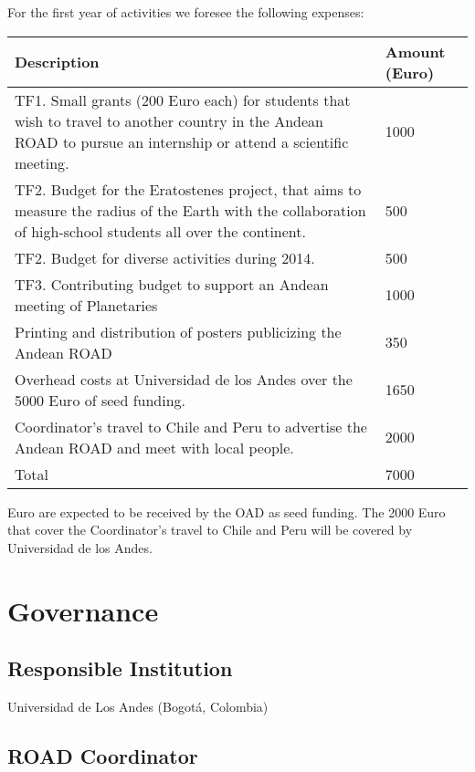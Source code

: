 \documentclass[12pt]{article}
\begin{document}
For the first year of activities we foresee the following expenses:

\begin{center}
\begin{tabular}{|p{11cm} |p{1.5cm}|}\hline\hline
Description &Amount (Euro) \\\hline
TF1. Small grants (200 Euro each) for students that wish to travel to
another country in the Andean ROAD to pursue an internship or attend a
scientific meeting. & 1000\\\hline
TF2. Budget for the Eratostenes project, that aims to measure the
radius of the Earth with the collaboration of high-school students all
over the continent. &500\\\hline
TF2. Budget for diverse activities during 2014.&500\\\hline
TF3. Contributing budget to support an Andean meeting of
Planetaries&1000\\\hline 
Printing and distribution of posters publicizing the Andean ROAD
&350\\\hline 
Overhead costs at Universidad de los Andes over the 5000 Euro of seed
funding. & 1650\\\hline 
Coordinator’s travel to Chile and Peru to advertise the Andean ROAD
and meet with local people.& 2000\\\hline 
Total &7000\\\hline\hline
\end{tabular}
\end{center}

 Euro are expected to be received by the OAD as seed funding. The
2000 Euro that cover the Coordinator’s travel to Chile and Peru will
be covered by Universidad de los Andes. 

\section{Governance}

\subsection*{Responsible Institution}

Universidad de Los Andes (Bogotá, Colombia)

\subsection*{ROAD Coordinator}
\end{document}
